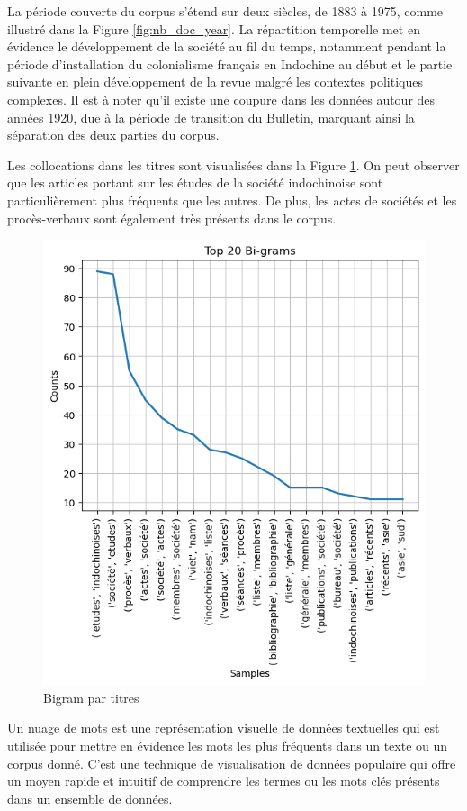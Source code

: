 La période couverte du corpus s'étend sur deux siècles, de 1883 à 1975, comme illustré dans la Figure \ref{fig:nb_doc_year}. La répartition temporelle met en évidence le développement de la société au fil du temps, notamment pendant la période d'installation du colonialisme français en Indochine au début et le partie suivante en plein développement de la revue  malgré les contextes politiques complexes. Il est à noter qu'il existe une coupure dans les données autour des années 1920, due à la période de transition du Bulletin, marquant ainsi la séparation des deux parties du corpus.

Les collocations dans les titres sont visualisées dans la Figure \ref{fig:bigram-title}. On peut observer que les articles portant sur les études de la société indochinoise sont particulièrement plus fréquents que les autres. De plus, les actes de sociétés et les procès-verbaux sont également très présents dans le corpus.
\begin{figure}
    \centering
    \includegraphics[width=12cm]{img/2.2.bigram-title.png}
    \caption{Bigram par titres}
    \label{fig:bigram-title}
\end{figure}

Un nuage de mots est une représentation visuelle de données textuelles qui est utilisée pour mettre en évidence les mots les plus fréquents dans un texte ou un corpus donné. C'est une technique de visualisation de données populaire qui offre un moyen rapide et intuitif de comprendre les termes ou les mots clés présents dans un ensemble de données.


